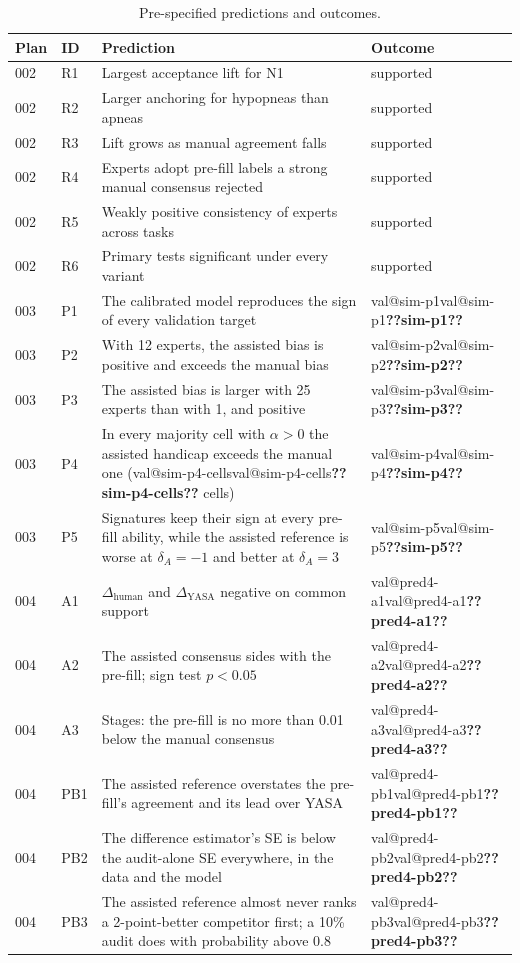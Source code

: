 \documentclass[11pt]{article}
\makeatletter
\newcommand{\val}[1]{\ifcsname val@#1\endcsname\csname val@#1\endcsname\else\textbf{??#1??}\PackageWarning{values}{Undefined value #1}\fi}
\newcommand{\dhuman}{\Delta_{\mathrm{human}}}
\newcommand{\dyasa}{\Delta_{\mathrm{YASA}}}
\makeatother
\begin{document}
\begin{table}[h!]
\centering\footnotesize
\caption{Pre-specified predictions and outcomes.}
\label{tab:s-predictions}
\begin{tabular}{llp{9.5cm}l}
\toprule
Plan & ID & Prediction & Outcome \\
\midrule
002 & R1 & Largest acceptance lift for N1 & supported \\
002 & R2 & Larger anchoring for hypopneas than apneas & supported \\
002 & R3 & Lift grows as manual agreement falls & supported \\
002 & R4 & Experts adopt pre-fill labels a strong manual consensus rejected & supported \\
002 & R5 & Weakly positive consistency of experts across tasks & supported \\
002 & R6 & Primary tests significant under every variant & supported \\
003 & P1 & The calibrated model reproduces the sign of every validation target & \val{sim-p1} \\
003 & P2 & With 12 experts, the assisted bias is positive and exceeds the manual bias & \val{sim-p2} \\
003 & P3 & The assisted bias is larger with 25 experts than with 1, and positive & \val{sim-p3} \\
003 & P4 & In every majority cell with $\alpha>0$ the assisted handicap exceeds the manual one (\val{sim-p4-cells} cells) & \val{sim-p4} \\
003 & P5 & Signatures keep their sign at every pre-fill ability, while the assisted reference is worse at $\delta_A=-1$ and better at $\delta_A=3$ & \val{sim-p5} \\
004 & A1 & $\dhuman$ and $\dyasa$ negative on common support & \val{pred4-a1} \\
004 & A2 & The assisted consensus sides with the pre-fill; sign test $p<0.05$ & \val{pred4-a2} \\
004 & A3 & Stages: the pre-fill is no more than 0.01 below the manual consensus & \val{pred4-a3} \\
004 & PB1 & The assisted reference overstates the pre-fill's agreement and its lead over YASA & \val{pred4-pb1} \\
004 & PB2 & The difference estimator's SE is below the audit-alone SE everywhere, in the data and the model & \val{pred4-pb2} \\
004 & PB3 & The assisted reference almost never ranks a 2-point-better competitor first; a 10\% audit does with probability above 0.8 & \val{pred4-pb3} \\

\end{tabular}
\end{table}
\end{document}
